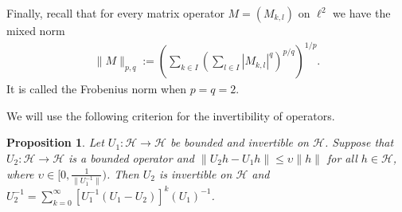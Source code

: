 \documentclass{birkjour}
\newtheorem{prop}[thm]{Proposition}
\theoremstyle{definition}
\theoremstyle{remark}
\numberwithin{equation}{section}
\begin{document}
 Finally, recall \cite{gr01} that for every matrix operator $M=(M_{k,l})$ on $\ell^2$ we have the mixed norm
 \begin{eqnarray*}
 \| M \|_{p,q} := \left(  \sum \limits_{k\in I} \left( \sum \limits_{l\in I}  \left| M_{k,l} \right|^{q} \right)^{p/q}\right)^{1/p}.
 \end{eqnarray*}
 It is called the Frobenius norm when $p=q=2.$



  We will use the following criterion for the invertibility
of operators.
\begin{prop} \cite{gohberg1}\label{invOP}
Let $U_1:\mathcal{H}\rightarrow \mathcal{H}$ be bounded and invertible on $\mathcal{H}$.
Suppose that $U_2:\mathcal{H}\rightarrow \mathcal{H}$ is a bounded
 operator and $\|U_{2}h-U_{1}h\|\leq \upsilon\|h\|$ for all $h\in \mathcal{H}$,
  where $\upsilon\in[0,\frac{1}{\|U_1^{-1}\|}
)$. Then
 $U_2$ is invertible on $\mathcal{H}$ and
    $U_2^{-1}=\sum_{k=0}^{\infty}[U_1^{-1}(U_1-U_2)]^{k}(U_1)^{-1}$.

\end{prop}
\end{document}
